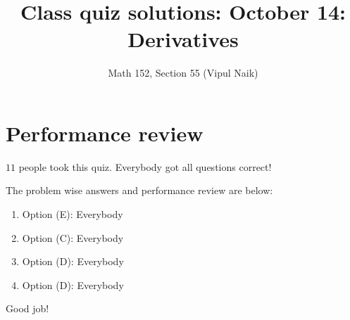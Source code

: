 \documentclass[10pt]{amsart}
\title{Class quiz solutions: October 14: Derivatives}
\author{Math 152, Section 55 (Vipul Naik)}
\begin{document}
\maketitle

\section{Performance review}

$11$ people took this quiz. Everybody got all questions correct!

The problem wise answers and performance review are below:
\begin{enumerate}
\item Option (E): Everybody
\item Option (C): Everybody
\item Option (D): Everybody
\item Option (D): Everybody
\end{enumerate}

Good job!
\end{document}
